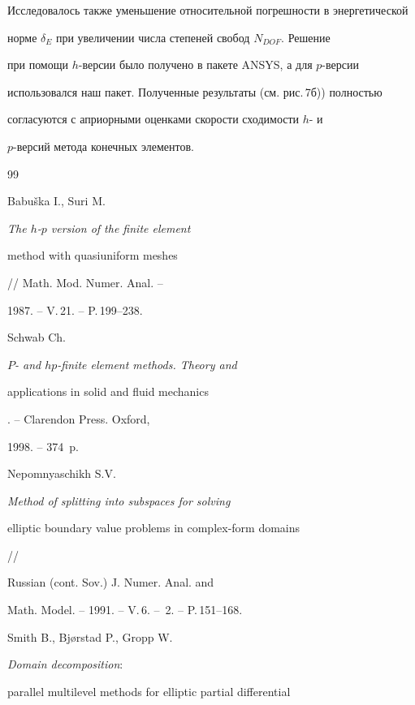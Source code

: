 Исследовалось также уменьшение относительной погрешности в энергетической 


норме $\delta_E$ при увеличении числа степеней свобод $N_{DOF}$. Решение 


при помощи $h$-версии было получено в пакете ANSYS, а для $p$-версии 


использовался наш пакет. Полученные результаты (см. рис.\,7б)) полностью 


согласуются с априорными оценками скорости сходимости $h$- и


$p$-версий метода конечных элементов.








\begin{thebibliography}{99}







Babu\v{s}ka I., Suri M. {\it The $h$-$p$ version of the finite element 


method with quasiuniform meshes} // Math. Mod. Numer. Anal. --


1987. -- V.\,21. -- P.\,199--238.







Schwab Ch. {\it $P$- and $hp$-finite element methods. Theory and 


applications in solid and fluid mechanics}. -- Clarendon Press. Oxford,


1998. -- 374~p.







Nepomnyaschikh S.V. {\it Method of splitting into subspaces for solving 


elliptic boundary value problems in complex-form domains} //


Russian (cont. Sov.) J. Numer. Anal. and


Math. Model. -- 1991. -- V.\,6. -- \No\,2. -- P.\,151--168.







Smith B., Bj{\o}rstad P., Gropp W. {\it Domain decomposition\/${:}$


parallel multilevel methods for elliptic partial differential 


}
\end{thebibliography}
